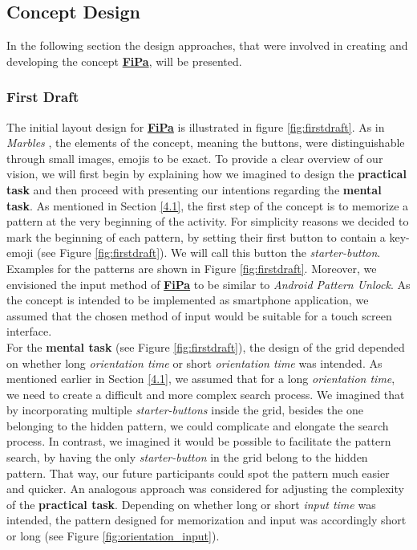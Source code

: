 \subsection{Concept Design} \label{4.2.2}


In the following section the design approaches, that were involved in creating and developing the concept \underline{\textbf{FiPa}}, will be presented.

\subsubsection{First Draft} \label{4.2.2.1}
The initial layout design for \underline{\textbf{FiPa}} is illustrated in figure \ref{fig:firstdraft}. As in \textit{Marbles} \cite{Marbles, Zezschwitz}, the elements of the concept, meaning the buttons, were distinguishable through small images, emojis to be exact. To provide a clear overview of our vision, we will first begin by explaining how we imagined to design the \textbf{practical task} and then proceed with presenting our intentions regarding the \textbf{mental task}. As mentioned in Section \ref{4.1}, the first step of the concept is to memorize a pattern at the very beginning of the activity. For simplicity reasons we decided to mark the beginning of each pattern, by setting their first button to contain a key-emoji (see Figure \ref{fig:firstdraft}). We will call this button the \textit{starter-button}. Examples for the patterns are shown in Figure \ref{fig:firstdraft}. Moreover, we envisioned the input method of \underline{\textbf{FiPa}} to be similar to \textit{Android Pattern Unlock}. As the concept is intended to be implemented as smartphone application, we assumed that the chosen method of input would be suitable for a touch screen interface. \\

For the \textbf{mental task} (see Figure \ref{fig:firstdraft}), the design of the grid depended on whether long \textit{orientation time} or short \textit{orientation time} was intended. As mentioned earlier in Section \ref{4.1}, we assumed that for a long \textit{orientation time}, we need to create a difficult and more complex search process. We imagined that by incorporating multiple \textit{starter-buttons} inside the grid, besides the one belonging to the hidden pattern, we could complicate and elongate the search process. In contrast, we imagined it would be possible to facilitate the pattern search, by having the only \textit{starter-button} in the grid belong to the hidden pattern. That way, our future participants could spot the pattern much easier and quicker. An analogous approach was considered for adjusting the complexity of the \textbf{practical task}. Depending on whether long or short \textit{input time} was intended, the pattern designed for memorization and input was accordingly short or long (see Figure \ref{fig:orientation_input}).

